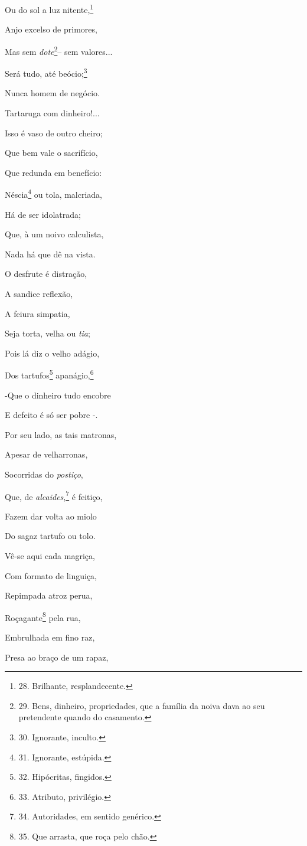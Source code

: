 Ou do sol a luz nitente,\footnote{28. Brilhante, resplandecente.}

Anjo excelso de primores,

Mas sem \emph{dote}\footnote{29. Bens, dinheiro, propriedades, que a
  família da noiva dava ao seu pretendente quando do casamento.}-- sem
valores...

Será tudo, até beócio;\footnote{30. Ignorante, inculto.}

Nunca homem de negócio.

Tartaruga com dinheiro!...

Isso é vaso de outro cheiro;

Que bem vale o sacrifício,

Que redunda em benefício:

Néscia\footnote{31. Ignorante, estúpida.} ou tola, malcriada,

Há de ser idolatrada;

Que, à um noivo calculista,

Nada há que dê na vista.

O desfrute é distração,

A sandice reflexão,

A feiura simpatia,

Seja torta, velha ou \emph{tia};

Pois lá diz o velho adágio,

Dos tartufos\footnote{32. Hipócritas, fingidos.} apanágio,\footnote{33.
  Atributo, privilégio.}

-Que o dinheiro tudo encobre

E defeito é só ser pobre -.

Por seu lado, as tais matronas,

Apesar de velharronas,

Socorridas do \emph{postiço},

Que, de \emph{alcaides},\footnote{34. Autoridades, em sentido genérico.}
é feitiço,

Fazem dar volta ao miolo

Do sagaz tartufo ou tolo.

Vê-se aqui cada magriça,

Com formato de linguiça,

Repimpada atroz perua,

Roçagante\footnote{35. Que arrasta, que roça pelo chão.} pela rua,

Embrulhada em fino raz,

Presa ao braço de um rapaz,

